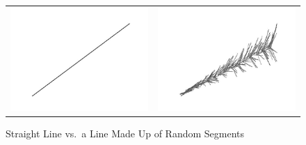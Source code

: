 \begin{figure}
\begin{center}
\begin{tabular}{ll}
\includegraphics[scale=1]{images-cmyk/straight-line} &
\includegraphics[scale=1]{images-cmyk/random-line-art} \\
\end{tabular}
\end{center}
\caption{Straight Line vs.~a Line Made Up of Random Segments}
\label{fig:line-art}
\end{figure}

